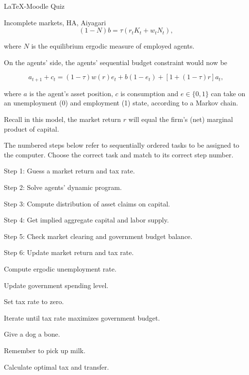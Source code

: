 \documentclass{article}
\begin{document}
\begin{quiz}{LaTeX-Moodle Quiz}
\begin{matching}[shuffle=false]{Incomplete markets, HA, Aiyagari}
        \[
          (1-N)b=\tau\left(r_{t}K_{t}+w_{t}N_{t}\right),
        \]

        where $N$ is the equilibrium ergodic measure of employed agents.

        On the agents' side, the agents' sequential budget constraint would now be

        \[
            a_{t+1} + c_{t} = (1-\tau)w(r)e_{t} + b(1-e_{t}) + \left[1+(1-\tau)r\right]a_{t},
        \]

        where $a$ is the agent's asset position, $c$ is consumption and $e\in\{0,1\}$ can take on an unemployment (0) and employment (1) state, according to a Markov chain.

        Recall in this model, the market return $r$ will equal the firm's (net) marginal product of capital.

        The numbered steps below refer to sequentially ordered tasks to be assigned to the computer. Choose the correct task and match to its
        correct step number.

        \item Step 1: \answer Guess a market return and tax rate.
        \item Step 2: \answer Solve agents' dynamic program.
        \item Step 3: \answer Compute distribution of asset claims on capital.
        \item Step 4: \answer Get implied aggregate capital and labor supply.
        \item Step 5: \answer Check market clearing and government budget balance.
        \item Step 6: \answer Update market return and tax rate.
        \item \answer Compute ergodic unemployment rate.
        \item \answer Update government spending level.
        \item \answer Set tax rate to zero.
        \item \answer Iterate until tax rate maximizes government budget.
        \item \answer Give a dog a bone.
        \item \answer Remember to pick up milk.
        \item \answer Calculate optimal tax and transfer.
    \end{matching}

\end{quiz}

\end{document}
